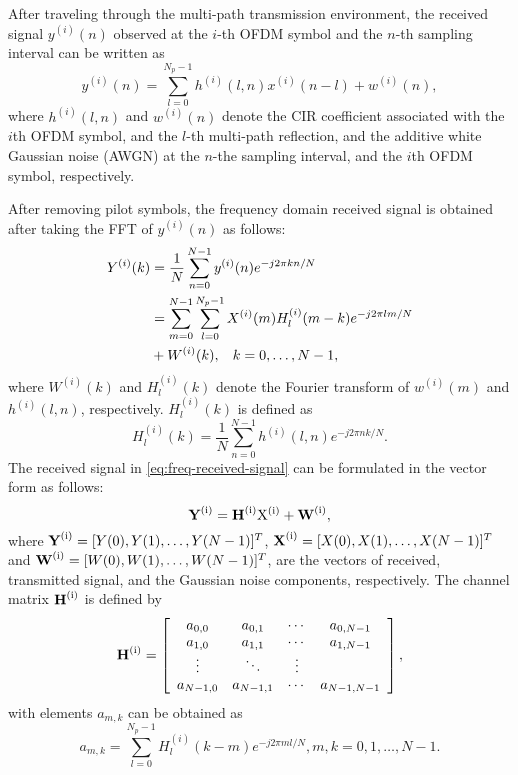 \documentclass[AMA]{WileyNJD-v1}
\begin{document}
After traveling through the multi-path transmission environment, the received signal $ y^{(i)}(n)$ observed at the $i$-th OFDM symbol and the $n$-th sampling interval can be written as
%
\begin{equation}\label{eq-time received signal} 
	y^{(i)}(n)= \sum_{l=0}^{{N_p}-1}h^{(i)}(l,n) x^{(i)}(n-l) + w^{(i)}(n),
\end{equation}
%
where $h^{(i)}(l,n)$  and  $w^{(i)}(n)$ denote the CIR coefficient associated with the $i$th OFDM symbol, and the $l$-th multi-path reflection, and  the additive white Gaussian noise (AWGN) at the  $n$-the sampling interval, and the $i$th OFDM symbol, respectively.
	
After removing pilot symbols, the frequency domain received signal is obtained after taking the FFT of $y^{(i)}(n)$ as follows:
%
\begin{equation}\label{eq:freq-received-signal}
	\begin{split}
	Y^{(i)}(k)&=\dfrac{1}{N} \sum_{n=0}^{N-1} y^{(i)}(n)e^{-j2\pi kn/N}\qquad\\
	&= \sum_{m=0}^{N-1}\sum_{l=0}^{N_p-1} X^{(i)}(m)H^{(i)}_{l}(m-k) e^{-j2\pi lm/N}  \\
	& + W^{(i)}(k), \hspace{0.3cm}k=0,\dots,N-1,
	\end{split}
\end{equation} 
%
where $W^{(i)}(k)$ and $H^{(i)}_l(k)$ denote the Fourier transform of $w^{(i)}(m)$ and $h^{(i)}(l,n)$, respectively. $H^{(i)}_{l}(k)$ is defined as
%
\begin{equation}\label{eq:fft-of-CIR}
	H^{(i)}_{l}(k)=\frac{1}{N} \sum_{n=0}^{N-1} h^{(i)}(l,n)e^{-j2\pi nk/N}.
\end{equation}
%
The received signal in \eqref{eq:freq-received-signal} can be formulated in the vector form as follows:
%
\begin{equation}\label{eq:vector-sinal}
	\rm {\textbf Y^{(i)}}= \rm{\textbf H^{(i)} X^{(i)}} +\rm {\textbf W^{(i)}}, 
\end{equation}
%
where ${\rm{\textbf Y^{(i)}}}=[Y(0),Y(1), \dots,Y(N-1)]^{T}$,  ${\rm {\textbf X^{(i)}}} =[X(0), X(1), \dots,X(N-1)]^{T}$ and  ${\rm {\textbf W^{(i)}}}=[W(0),W(1), \dots, W(N-1)]^{T}$, are the vectors of received, transmitted signal, and the Gaussian noise components, respectively. The channel matrix $\rm{\textbf H^{(i)}}$ is defined by
%
\begin{equation}\label{eq:matrix-channel}
	\rm{\textbf H^{(i)}}=\left[\begin{array}{cccc}
	a_{0,0}& a_{0,1} &  \cdots &  a_{0,N-1} \\
	a_{1,0}&  a_{1,1}&  \cdots &  a_{1,N-1}  \\
	\vdots &  \ddots&  \vdots \\
	a_{N-1,0}&  a_{N-1,1}&  \cdots &  a_{N-1,N-1}
	\end{array}\right],
\end{equation}
%
with elements $a_{m,k}$ can be obtained as 
%
\begin{equation*}
a_{m,k}=\sum_{l=0}^{N_p-1}H^{(i)}_l(k-m) e^{-j2\pi ml/N},m,k=0,1,\dots,N-1.
\end{equation*}
%
	
\end{document}
